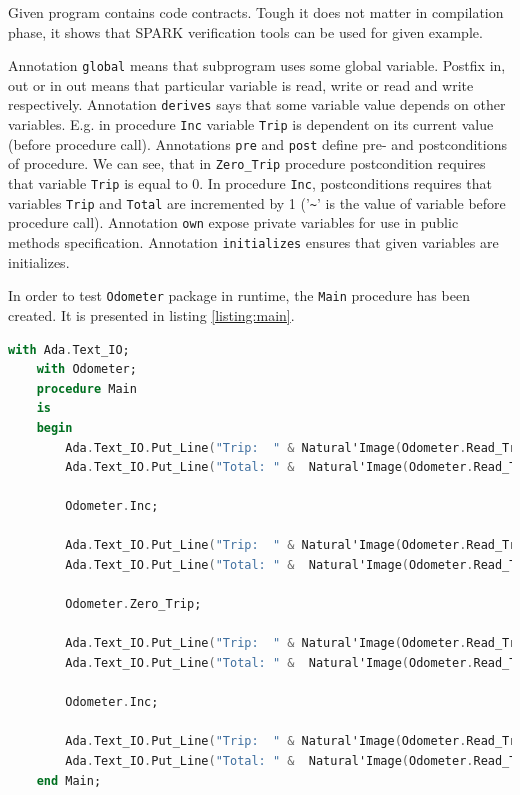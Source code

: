 Given program contains code contracts. Tough it does not matter in compilation phase, it shows that SPARK verification tools can be used for given example. 

Annotation \lstinline{global} means that subprogram uses some global variable. Postfix in, out or in out means that particular variable is read, write or read and write respectively. Annotation \lstinline{derives} says that some variable value depends on other variables. E.g. in procedure \lstinline{Inc} variable \lstinline{Trip} is dependent on its current value (before procedure call). Annotations \lstinline{pre} and \lstinline{post} define pre- and postconditions of procedure. We can see, that in \lstinline{Zero_Trip} procedure postcondition requires that variable \lstinline{Trip} is equal to 0. In procedure \lstinline{Inc}, postconditions requires that variables \lstinline{Trip} and \lstinline{Total} are incremented by 1 ('\lstinline{~}' is the value of variable before procedure call). Annotation \lstinline{own} expose private variables for use in public methods specification. Annotation \lstinline{initializes} ensures that given variables are initializes. 

In order to test \lstinline{Odometer} package in runtime, the \lstinline{Main} procedure has been created. It is presented in listing \ref{listing:main}.


\singlespacing
\begin{lstlisting}[language=ada, frame=single, gobble=0, caption={Main procedure for \lstinline{Odometer} package}]
	with Ada.Text_IO;
	with Odometer;
	procedure Main
	is
	begin
	    Ada.Text_IO.Put_Line("Trip:  " & Natural'Image(Odometer.Read_Trip));
	    Ada.Text_IO.Put_Line("Total: " &  Natural'Image(Odometer.Read_Total));

	    Odometer.Inc;

	    Ada.Text_IO.Put_Line("Trip:  " & Natural'Image(Odometer.Read_Trip));
	    Ada.Text_IO.Put_Line("Total: " &  Natural'Image(Odometer.Read_Total));

	    Odometer.Zero_Trip;

	    Ada.Text_IO.Put_Line("Trip:  " & Natural'Image(Odometer.Read_Trip));
	    Ada.Text_IO.Put_Line("Total: " &  Natural'Image(Odometer.Read_Total));

	    Odometer.Inc;

	    Ada.Text_IO.Put_Line("Trip:  " & Natural'Image(Odometer.Read_Trip));
	    Ada.Text_IO.Put_Line("Total: " &  Natural'Image(Odometer.Read_Total));
	end Main;
\end{lstlisting} 
\label{listing:main}
\doublespacing

